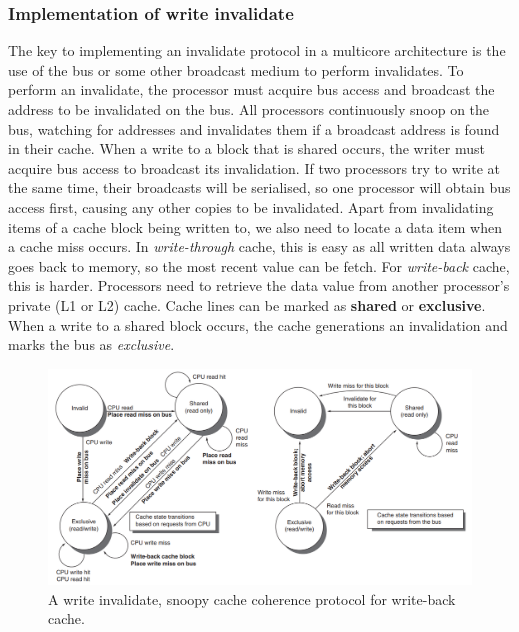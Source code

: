 \documentclass[11pt]{article}
\begin{document}
\subsubsection*{Implementation of write invalidate}
The key to implementing an invalidate protocol in a multicore architecture is the use of the bus or some other broadcast medium to perform invalidates. To perform an invalidate, the processor must acquire bus access and broadcast the address to be invalidated on the bus. All processors continuously snoop on the bus, watching for addresses and invalidates them if a broadcast address is found in their cache. 
\n
When a write to a block that is shared occurs, the writer must acquire bus access to broadcast its invalidation. If two processors try to write at the same time, their broadcasts will be serialised, so one processor will obtain bus access first, causing any other copies to be invalidated. 
\n
Apart from invalidating items of a cache block being written to, we also need to locate a data item when a cache miss occurs. In \textit{write-through} cache, this is easy as all written data always goes back to memory, so the most recent value can be fetch. For \textit{write-back} cache, this is harder. Processors need to retrieve the data value from another processor's private (L1 or L2) cache. 
\n
Cache lines can be marked as \textbf{shared} or \textbf{exclusive}. When a write to a shared block occurs, the cache generations an invalidation and marks the bus as \textit{exclusive}. 
\begin{figure}[H]
\centering
\includegraphics[width=1\textwidth, keepaspectratio]{imgs/snoopy.png}
\caption{A write invalidate, snoopy cache coherence protocol for write-back cache.}
\end{figure}
\end{document}
